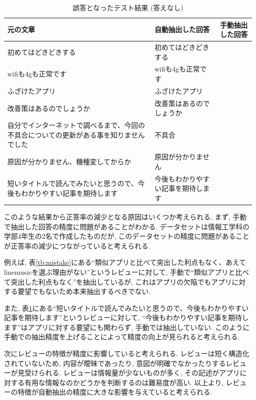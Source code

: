 \begin{table}[H]
  \caption{誤答となったテスト結果 (答えなし) }
  \label{tb:mistake2}
  \begin{center}
  \begin{tabularx}{\linewidth}{X|X|X}
    \hline
    元の文章&自動抽出した回答&手動抽出した回答\\\hline\hline
    初めてはどきどきする&初めてはどきどきする&\\\hline
    wifiも4gも正常です&wifiも4gも正常です&\\\hline
    ふざけたアプリ&ふざけたアプリ&\\\hline
    改善策はあるのでしょうか&改善策はあるのでしょうか&\\\hline
    自分でインターネットで調べるまで、今回の不具合についての更新がある事を知りませんでした&不具合&\\\hline
    原因が分かりません、機種変してからか&原因が分かりません&\\\hline
    短いタイトルで読んでみたいと思うので、今後もわかりやすい記事を期待します&今後もわかりやすい記事を期待します&\\\hline
  \end{tabularx}\end{center}
\end{table}

このような結果から正答率の減少となる原因はいくつか考えられる. まず, 手動で抽出した回答の精度に問題があることがわかる. データセットは情報工学科の学部4年生の2名で作成したものだが, このデータセットの精度に問題があることが正答率の減少につながっていると考えられる. 

例えば, 表\ref{tb:mistake}にある``類似アプリと比べて突出した利点もなく、あえてlinemusicを選ぶ理由がない''というレビューに対して, 手動で``類似アプリと比べて突出した利点もなく''を抽出しているが, これはアプリの欠陥でもアプリに対する要望でもないため本来抽出するべきでない. 

また, 表\ref{tb:mistake2}にある``短いタイトルで読んでみたいと思うので、今後もわかりやすい記事を期待します''というレビューに対して, ``今後もわかりやすい記事を期待します''はアプリに対する要望にも関わらず, 手動では抽出していない. このように手動での抽出精度を上げることによって精度の向上が見られると考えられる. 

次にレビューの特徴が精度に影響していると考えられる. レビューは短く構造化されていないため, 内容が曖昧であったり, 意図が明確でなかったりするレビューが見受けられる. レビューは情報量が少ないものが多く, その記述がアプリに対する有用な情報なのかどうかを判断するのは難易度が高い. 以上より, レビューの特徴が自動抽出の精度に大きな影響を与えていると考えられる. 


